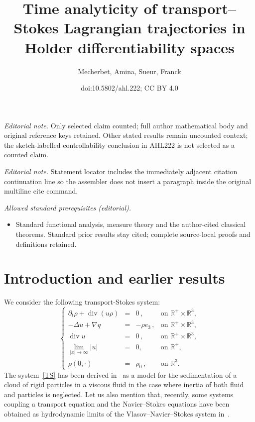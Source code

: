 \documentclass[10pt]{amsart}
\title{Time analyticity of transport--Stokes Lagrangian trajectories in Holder differentiability spaces}
\author{Mecherbet, Amina, Sueur, Franck}
\date{doi:10.5802/ahl.222; CC BY 4.0}
\theoremstyle{definition}\newtheorem{defi}[theo]{Definition}\newtheorem{rema}[theo]{Remark}\newtheorem{exam}[theo]{Example}\newtheorem{exem}[theo]{Example}\newtheorem{nota}[theo]{Notation}
\newcommand{\R}{\mathbb{R}}
\renewcommand{\div}{\operatorname{div}}
\begin{document}
\maketitle
\noindent\textit{Editorial note.} Only selected claim counted; full author mathematical body and original reference keys retained. Other stated results remain uncounted context; the sketch-labelled controllability conclusion in AHL222 is not selected as a counted claim.\par\medskip
\noindent\textit{Editorial note.} Statement locator includes the immediately adjacent citation continuation line so the assembler does not insert a paragraph inside the original multiline cite command.\par\medskip
\noindent\textit{Allowed standard prerequisites (editorial).}\begin{itemize}
\item Standard functional analysis, measure theory and the author-cited classical theorems. Standard prior results stay cited; complete source-local proofs and definitions retained.
\end{itemize}\medskip


\section{Introduction and earlier results}

We consider the following transport-Stokes system:
\begin{equation}\label{TS}
\left\{
\begin{array}{rcll}
\partial_t \rho+{\div}(u \rho) &=& 0\,,& \text{on }\R^+ \times \R^3,\\
- \Delta u+ \nabla q &=& - \rho e_3 \,,& \text{on }\R^+ \times \R^3,\\
\div u & =&0\,,& \text{on }\R^+ \times \R^3,\\
\underset{|x|\to \infty}{\lim}|u| &=& 0,& \text{on } \R^+,\\
\rho(0,\cdot) &= & \rho_0 \,,&\text{on } \R^3.
\end{array}
\right.
\end{equation}
The system~\eqref{TS} has been derived in~\cite{Hofer, Mecherbet} as a model for the sedimentation of a cloud of rigid particles in a viscous fluid in the case where inertia of both fluid and particles is neglected. Let us also mention that, recently, some systems coupling a transport equation and the Navier--Stokes equations have been obtained as hydrodynamic limits of the Vlasov--Navier--Stokes system in~\cite{HKM}.
\end{document}
